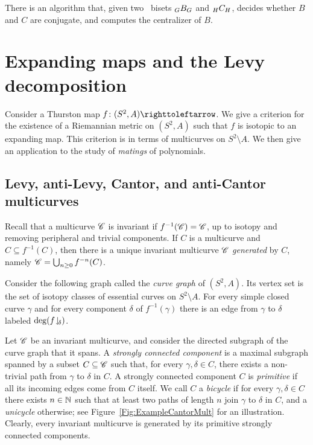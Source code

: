 \documentclass{amsart}
\begin{document}
\begin{cor}\label{cor:tordecidable}
  There is an algorithm that, given two \Tor\ bisets $\subscript GB_G$ and
  $\subscript H C_H$, decides whether $B$ and $C$ are conjugate, and computes
  the centralizer of $B$.
\end{cor}

\section{Expanding maps and the Levy decomposition~\cite{bartholdi-dudko:bc4}}\label{ss:expanding}
Consider a Thurston map $f\colon(S^2, A)\selfmap$. We give a criterion
for the existence of a Riemannian metric on $(S^2,A)$ such that $f$ is
isotopic to an expanding map. This criterion is in terms of
multicurves on $S^2\setminus A$. We then give an application to the
study of \emph{matings} of polynomials.

\subsection{Levy, anti-Levy, Cantor, and anti-Cantor multicurves}
Recall that a multicurve ${\mathscr C}$ is invariant if $f^{-1}({\mathscr C})={\mathscr C}$, up
to isotopy and removing peripheral and trivial components.  If $C$ is
a multicurve and $C\subseteq f^{-1}(C)$, then there is a unique
invariant multicurve ${\mathscr C}$ \emph{generated} by $C$, namely
${\mathscr C}=\bigcup_{n\ge 0} f^{-n}(C)$.

Consider the following graph called the \emph{curve graph} of
$(S^2,A)$. Its vertex set is the set of isotopy classes of essential
curves on $S^2\setminus A$. For every simple closed curve $\gamma$ and
for every component $\delta$ of $f^{-1}(\gamma)$ there is an edge from
$\gamma$ to $\delta$ labeled $\deg(f\!\downharpoonleft_{\!\delta})$.

Let ${\mathscr C}$ be an invariant multicurve, and consider the directed
subgraph of the curve graph that it spans. A \emph{strongly connected
  component} is a maximal subgraph spanned by a subset $C\subseteq{\mathscr C}$
such that, for every $\gamma,\delta\in C$, there exists a non-trivial
path from $\gamma$ to $\delta$ in $C$. A strongly connected component
$C$ is \emph{primitive} if all its incoming edges come from $C$
itself. We call $C$ a \emph{bicycle} if for every $\gamma,\delta\in C$
there exists $n\in{\mathbb N}$ such that at least two paths of length $n$ join
$\gamma$ to $\delta$ in $C$, and a \emph{unicycle} otherwise; see
Figure~\ref{Fig:ExampleCantorMult} for an illustration.  Clearly,
every invariant multicurve is generated by its primitive strongly
connected components.
\end{document}
